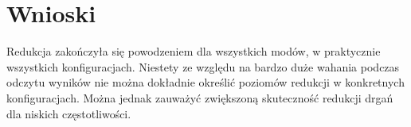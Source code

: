\documentclass[polish,a4paper,11pt]{mwart}
\let\Oldsection\section
\renewcommand{\section}{\FloatBarrier\Oldsection}
\begin{document}
  \section{Wnioski}
  
  Redukcja zakończyła się powodzeniem dla wszystkich modów, w praktycznie
  wszystkich konfiguracjach. Niestety ze względu na bardzo duże wahania podczas
  odczytu wyników nie można dokładnie określić poziomów redukcji w konkretnych
  konfiguracjach. Można jednak zauważyć zwiększoną skuteczność redukcji drgań
  dla niskich częstotliwości.
\end{document}
